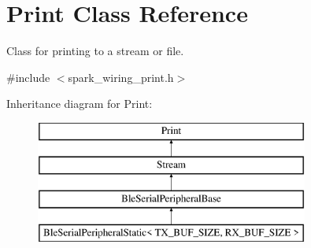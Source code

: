 \hypertarget{class_print}{}\section{Print Class Reference}
\label{class_print}


Class for printing to a stream or file.  




{\ttfamily \#include $<$spark\+\_\+wiring\+\_\+print.\+h$>$}

Inheritance diagram for Print\+:\begin{figure}[H]
\begin{center}
\leavevmode
\includegraphics[height=4.000000cm]{class_print}
\end{center}
\end{figure}
